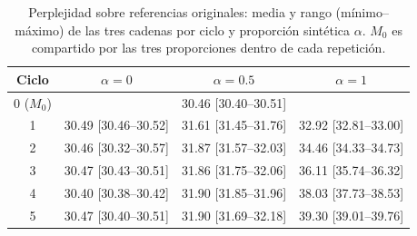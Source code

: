 
\begin{table}[ht]
\centering
\footnotesize
\begin{tabular}{c c c c}
\hline
Ciclo & $\alpha=0$ & $\alpha=0.5$ & $\alpha=1$ \\
\hline
0 ($M_0$) & \multicolumn{3}{c}{30.46 [30.40--30.51]} \\
1 & 30.49 [30.46--30.52] & 31.61 [31.45--31.76] & 32.92 [32.81--33.00] \\
2 & 30.46 [30.32--30.57] & 31.87 [31.57--32.03] & 34.46 [34.33--34.73] \\
3 & 30.47 [30.43--30.51] & 31.86 [31.75--32.06] & 36.11 [35.74--36.32] \\
4 & 30.40 [30.38--30.42] & 31.90 [31.85--31.96] & 38.03 [37.73--38.53] \\
5 & 30.47 [30.40--30.51] & 31.90 [31.69--32.18] & 39.30 [39.01--39.76] \\
\hline
\end{tabular}
\caption{Perplejidad sobre referencias originales: media y rango (mínimo--máximo) de las tres cadenas por ciclo y proporción sintética $\alpha$. $M_0$ es compartido por las tres proporciones dentro de cada repetición.}
\label{tab:medias_human_perplexity}
\end{table}
